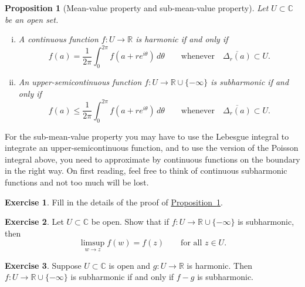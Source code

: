 \documentclass[12pt,openany]{book}
\newcommand{\C}{{\mathbb{C}}}
\newcommand{\R}{{\mathbb{R}}}
\theoremstyle{plain}
\newtheorem{prop}[thm]{Proposition}
\theoremstyle{remark}
\theoremstyle{definition}
\newenvironment{exbox}{%
    \def\FrameCommand{\vrule width 1pt \relax\hspace{10pt}}%
    \MakeFramed {\advance \hsize -\width \FrameRestore}%
}{%
    \endMakeFramed
}
\theoremstyle{exercise}
\newtheorem{exercise}{Exercise}[section]
\theoremstyle{example}
\newcommand{\propref}[1]{\hyperref[#1]{Proposition~\ref*{#1}}}
\begin{document}
\begin{prop}[Mean-value property and sub-mean-value property]
\pagebreak[2]
\label{prop:meansubmeanprop}
Let $U \subset \C$ be an open set.
\begin{enumerate}[(i)]
\item
A continuous function
$f \colon U \to \R$
is harmonic if and only if 
\begin{equation*}
f(a) = \frac{1}{2\pi} \int_0^{2\pi} f(a+re^{i\theta})\, d\theta
\qquad \text{whenever} \quad
\overline{\Delta_r(a)} \subset U .
\end{equation*}
\item
An upper-semicontinuous function $f \colon U \to \R \cup \{ -\infty \}$
is subharmonic if and only if
\begin{equation*}
f(a) \leq \frac{1}{2\pi} \int_0^{2\pi} f(a+re^{i\theta})\, d\theta
\qquad \text{whenever} \quad
\overline{\Delta_r(a)} \subset U .
\end{equation*}
\end{enumerate}
\end{prop}

For the sub-mean-value property you may have to use 
the Lebesgue integral to integrate an upper-semicontinuous function,
and to use the version of the Poisson integral above, you need to
approximate by continuous functions on the boundary in the right way.
On first reading, feel free to think of continuous subharmonic
functions and not too much will be lost.

\begin{exbox}
\begin{exercise}
Fill in the details of the proof of \propref{prop:meansubmeanprop}.
\end{exercise}

\begin{exercise}
Let $U \subset \C$ be open.
Show that if $f \colon U \to \R \cup\{- \infty \}$ is subharmonic,
then 
\begin{equation*}
\limsup_{w \to z} f(w) = f(z) 
\qquad \text{for all $z \in U$.}
\end{equation*}
\end{exercise}

\begin{exercise} \label{exercise:fminusgsubharmonic}
Suppose $U \subset \C$ is open and $g \colon U \to \R$ is harmonic.
Then $f \colon U \to \R \cup \{ -\infty \}$ is subharmonic if and only if $f-g$
is subharmonic.
\end{exercise}
\end{exbox}
\end{document}

